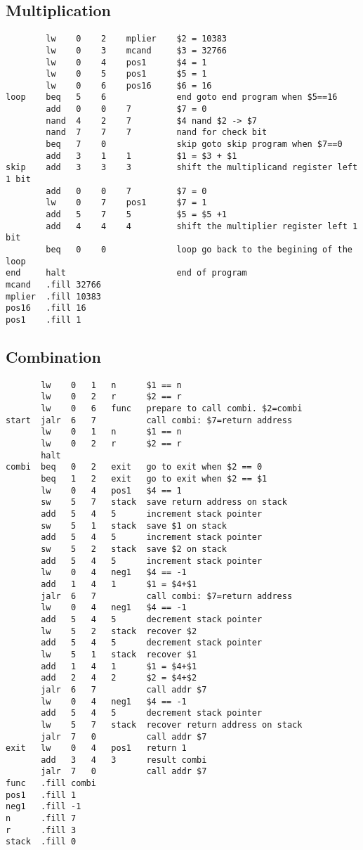 \documentclass[14pt]{article}
\begin{document}
\subsection{Multiplication}
\begin{lstlisting}
        lw    0    2    mplier    $2 = 10383
        lw    0    3    mcand     $3 = 32766
        lw    0    4    pos1      $4 = 1
        lw    0    5    pos1      $5 = 1
        lw    0    6    pos16     $6 = 16
loop    beq   5    6              end goto end program when $5==16
        add   0    0    7         $7 = 0
        nand  4    2    7         $4 nand $2 -> $7
        nand  7    7    7         nand for check bit
        beq   7    0              skip goto skip program when $7==0
        add   3    1    1         $1 = $3 + $1
skip    add   3    3    3         shift the multiplicand register left 1 bit
        add   0    0    7         $7 = 0
        lw    0    7    pos1      $7 = 1
        add   5    7    5         $5 = $5 +1
        add   4    4    4         shift the multiplier register left 1 bit
        beq   0    0              loop go back to the begining of the loop
end     halt                      end of program
mcand   .fill 32766
mplier  .fill 10383
pos16   .fill 16
pos1    .fill 1
\end{lstlisting}

\subsection{Combination}
\begin{lstlisting}
       lw    0   1   n      $1 == n 
       lw    0   2   r      $2 == r
       lw    0   6   func   prepare to call combi. $2=combi 
start  jalr  6   7          call combi: $7=return address
       lw    0   1   n      $1 == n
       lw    0   2   r      $2 == r
       halt
combi  beq   0   2   exit   go to exit when $2 == 0
       beq   1   2   exit   go to exit when $2 == $1
       lw    0   4   pos1   $4 == 1
       sw    5   7   stack  save return address on stack
       add   5   4   5      increment stack pointer
       sw    5   1   stack  save $1 on stack
       add   5   4   5      increment stack pointer
       sw    5   2   stack  save $2 on stack
       add   5   4   5      increment stack pointer
       lw    0   4   neg1   $4 == -1
       add   1   4   1      $1 = $4+$1
       jalr  6   7          call combi: $7=return address
       lw    0   4   neg1   $4 == -1
       add   5   4   5      decrement stack pointer
       lw    5   2   stack  recover $2
       add   5   4   5      decrement stack pointer
       lw    5   1   stack  recover $1
       add   1   4   1      $1 = $4+$1
       add   2   4   2      $2 = $4+$2
       jalr  6   7          call addr $7
       lw    0   4   neg1   $4 == -1
       add   5   4   5      decrement stack pointer
       lw    5   7   stack  recover return address on stack
       jalr  7   0          call addr $7
exit   lw    0   4   pos1   return 1
       add   3   4   3      result combi
       jalr  7   0          call addr $7
func   .fill combi
pos1   .fill 1
neg1   .fill -1
n      .fill 7
r      .fill 3
stack  .fill 0
    
\end{lstlisting}
\end{document}
